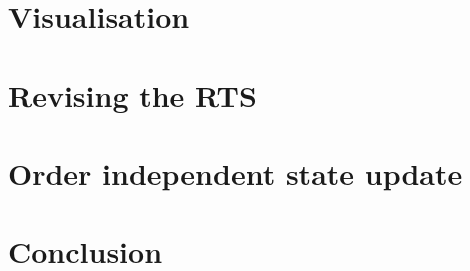 \documentclass[a4paper,twoside]{report}
\begin{document}
\chapter{Visualisation}
\label{chap:tscope}


\chapter{Revising the RTS}
\label{ref:rts}


\chapter{Order independent state update}
\label{ref:order_indep_state_update}


\chapter{Conclusion}




\end{document}
